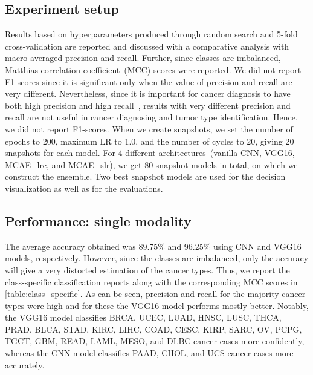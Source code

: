 \subsection{Experiment setup}
Results based on hyperparameters produced through random search and 5-fold cross-validation are reported and discussed with a comparative analysis with macro-averaged precision and recall. Further, since classes are imbalanced, Matthias correlation coefficient~(MCC) scores were reported. We did not report F1-scores since it is significant only when the value of precision and recall are very different. Nevertheless, since it is important for cancer diagnosis to have both high precision and high recall~\cite{naulaerts2017precision}, results with very different precision and recall are not useful in cancer diagnosing and tumor type identification. Hence, we did not report F1-scores. When we create snapshots, we set the number of epochs to 200, maximum LR to 1.0, and the number of cycles to 20, giving 20 snapshots for each model. For 4 different  architectures~(vanilla CNN, VGG16, MCAE\_{lrc}, and MCAE\_{slr}), we get 80 snapshot models in total, on which we construct the ensemble. Two best snapshot models are used for the decision visualization as well as for the evaluations. 

\subsection{Performance: single modality}
The average accuracy obtained was 89.75\% and 96.25\% using CNN and VGG16 models, respectively. However, since the classes are imbalanced, only the accuracy will give a very distorted estimation of the cancer types. Thus, we report the class-specific classification reports along with the corresponding MCC scores in \cref{table:class_specific}. As can be seen, precision and recall for the majority cancer types were high and for these the VGG16 model performs mostly better. Notably, the VGG16 model classifies BRCA, UCEC, LUAD, HNSC, LUSC, THCA, PRAD, BLCA, STAD, KIRC, LIHC, COAD, CESC, KIRP, SARC, OV, PCPG, TGCT, GBM, READ, LAML, MESO, and DLBC cancer cases more confidently, whereas the CNN model classifies PAAD, CHOL, and UCS cancer cases more accurately. 

